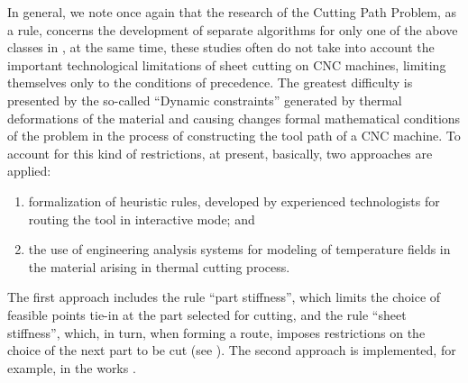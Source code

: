 \documentclass[numbers,sort&compress]{IntechOpen-Book}%
\begin{document}
In general, we note once again that the research of the Cutting Path Problem, as a rule, concerns the development of separate algorithms for only one of the above classes in \cite{bibx:109},
at the same time,
these studies often do not take into account the important technological limitations of sheet cutting on CNC machines,
limiting themselves only to the conditions of precedence.
The greatest difficulty is presented by the so-called ``Dynamic constraints''
generated by thermal deformations of the material and causing changes
formal mathematical conditions of the problem
in the process of constructing the tool path of a CNC machine.
To account for this kind of restrictions, at present, basically,
two approaches are applied:
\begin{enumerate}
  \item
  formalization of heuristic rules,
  developed by experienced technologists for routing the tool in
  interactive mode; and
  \item
  the use of engineering analysis systems for
  modeling of temperature fields in the material arising in
  thermal cutting process.
\end{enumerate}

The first approach includes the rule
``part stiffness'',
which limits the choice of feasible points
tie-in at the part selected for cutting, and the rule
``sheet stiffness'',
which, in turn, when forming a route, imposes restrictions on the choice of the next part to be cut
(see \cite[part I]{4}).
The second approach is implemented, for example, in the works \cite{bibx:114,bibx:116}.
\end{document}
